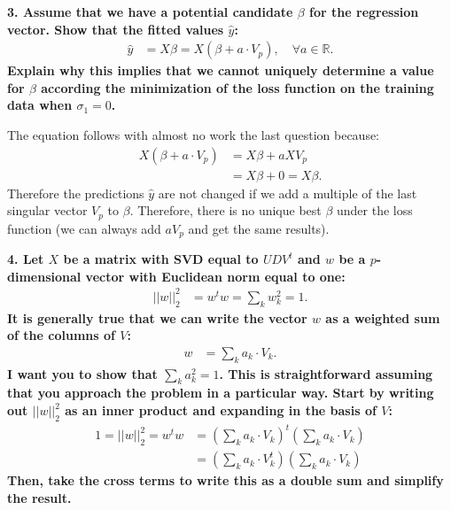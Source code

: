 \documentclass[12pt,hidelinks]{article}
\numberwithin{equation}{section}
\begin{document}
\vspace*{12pt}

\textbf{3. Assume that we have a potential candidate $\beta$ for the regression vector.
Show that the fitted values $\widehat{y}$:}
\begin{align}
\widehat{y} &= X \beta = X (\beta + a \cdot V_p), \quad \forall a \in \mathbb{R}.
\end{align}
\textbf{Explain why this implies that we cannot uniquely determine a value for $\beta$
according the minimization of the loss function on the training data when
$\sigma_1 = 0$.}

\vspace*{12pt}

The equation follows with almost no work the last question because:
\begin{align}
X (\beta + a \cdot V_p) &= X \beta + a X V_p \\
&= X \beta + 0 = X \beta.
\end{align}
Therefore the predictions $\widehat{y}$ are not changed if we add a multiple
of the last singular vector $V_p$ to $\beta$. Therefore, there is no unique
best $\beta$ under the loss function (we can always add $a V_p$ and get the
same results).

\vspace*{12pt}

\textbf{4. Let $X$ be a matrix with SVD equal to $UDV^t$ and $w$ be a
$p$-dimensional vector with Euclidean norm equal to one:}
\begin{align}
|| w ||_2^2 &= w^t w = \sum_k w_k^2 = 1.
\end{align}
\textbf{It is generally true that we can write the vector $w$ as a weighted sum of
the columns of $V$:}
\begin{align}
w &= \sum_k a_k \cdot V_k.
\end{align}
\textbf{I want you to show that $\sum_k a_k^2 = 1$. This is straightforward
assuming that you approach the problem in a particular way. Start
by writing out $|| w ||_2^2$ as an inner product and expanding in the basis
of $V$:}
\begin{align}
1 = || w ||_2^2 = w^t w &= \left(\sum_k a_k \cdot V_k \right)^t \left(\sum_k a_k \cdot V_k \right) \\
&= \left(\sum_k a_k \cdot V_k^t \right) \left(\sum_k a_k \cdot V_k \right)
\end{align}
\textbf{Then, take the cross terms to write this as a double sum and simplify the
result.}

\vspace*{12pt}
\end{document}
